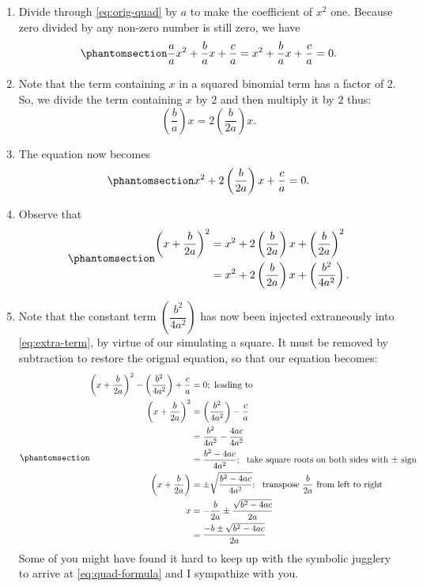 \documentclass[
  a4paper,
]{article}
\begin{document}
\begin{enumerate}
\item
  Divide through \cref{eq:orig-quad} by \(a\) to make the coefficient of
  \(x^2\) one. Because zero divided by any non-zero number is still
  zero, we have \begin{equation}\phantomsection\label{eq:no-a}{
  \frac{a}{a}x^2 + \frac{b}{a}x + \frac{c}{a} = x^2 + \frac{b}{a}x + \frac{c}{a} = 0.
  }\end{equation}
\item
  Note that the term containing \(x\) in a squared binomial term has a
  factor of \(2\). So, we divide the term containing \(x\) by \(2\) and
  then multiply it by \(2\) thus: \[
  \left(\frac{b}{a}\right)x = 2\left(\frac{b}{2a}\right)x.
  \]
\item
  The equation now becomes
  \begin{equation}\phantomsection\label{eq:normalized-one}{
  x^2 + 2\left(\frac{b}{2a}\right)x + \frac{c}{a} = 0.
  }\end{equation}
\item
  Observe that \begin{equation}\phantomsection\label{eq:extra-term}{
  \begin{aligned}
  \left(x + \frac{b}{2a}\right)^2 &= x^2 + 2\left(\frac{b}{2a}\right)x + \left(\frac{b}{2a}\right)^2\\
  &= x^2 + 2\left(\frac{b}{2a}\right)x + \left(\frac{b^2}{4a^2}\right).
  \end{aligned}
  }\end{equation}
\item
  Note that the constant term \(\left(\dfrac{b^2}{4a^2}\right)\) has now
  been injected extraneously into \cref{eq:extra-term}, by virtue of our
  simulating a square. It must be removed by subtraction to restore the
  orignal equation, so that our equation becomes:
  \begin{equation}\phantomsection\label{eq:quad-formula}{
  \begin{aligned}
  \left(x + \frac{b}{2a}\right)^2 - \left(\frac{b^2}{4a^2}\right) + \frac{c}{a} &= 0; \text{ leading to}\\
  \left(x + \frac{b}{2a}\right)^2 &= \left(\frac{b^2}{4a^2}\right) - \frac{c}{a}\\
  &= \frac{b^2}{4a^2} - \frac{4ac}{4a^2}\\
  &= \frac{b^2 - 4ac}{4a^2};\ \text{ take square roots on both sides with $\pm$ sign}\\
  \left(x + \frac{b}{2a}\right) &= \pm\sqrt{\frac{b^2 - 4ac}{4a^2}};\ \text{ transpose $\frac{b}{2a}$ from left to right}\\
  x &= -\frac{b}{2a} \pm \frac{\sqrt{b^2 - 4ac}}{2a}\\
  &=\frac{-{b} \pm \sqrt{b^2 - 4ac}}{2a}
  \end{aligned}
  }\end{equation} Some of you might have found it hard to keep up with
  the symbolic jugglery to arrive at \cref{eq:quad-formula} and I
  sympathize with you.
\end{enumerate}
\end{document}
